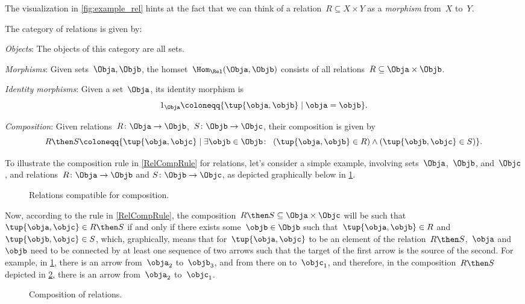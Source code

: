 The visualization in \cref{fig:example_rel} hints at the fact that we can think of a relation~$R \subseteq X \times Y$ as a \emph{morphism} from~$X$ to~$Y$.

\begin{ctdefinition}
  The category \iindex{\Rel} of relations \Rel is given by:
  \begin{compactenum}
    \item \emph{Objects}: The objects of this category are all sets.
    \item \emph{Morphisms}: Given sets~$\Obja, \Objb$, the homset~$\Hom_{\Rel}(\Obja,\Objb)$ consists of all
    relations~$R\subseteq \Obja\times \Objb$.
    \item \emph{Identity morphisms}: Given a set~$\Obja$, its identity morphism is
    \begin{equation}
      1_\Obja \coloneqq \{ \tup{\obja,\objb} \mid  \obja = \objb \}.
    \end{equation}
    \item \emph{Composition}: Given relations~$R \colon \Obja\to \Objb$,~$S\colon \Objb\to \Objc$, their composition is given by
    \begin{equation}
      \label{RelCompRule}
      R \then S \coloneqq \{\tup{\obja,\objc} \mid  \exists \objb \in \Objb \colon \ \left(\tup{\obja,\objb} \in R\right) \wedge \left(\tup{\objb,\objc} \in S\right)\}.
    \end{equation}
  \end{compactenum}
\end{ctdefinition}

To illustrate the composition rule in \cref{RelCompRule} for relations, let's consider a simple example, involving sets~$\Obja$,~$\Objb$, and~$\Objc$, and relations~$R \colon \Obja \to \Objb$ and $S \colon \Objb \to \Objc$, as depicted graphically below in \cref{fig:example_rel_composable}.
\begin{figure}[h!]
  \centering
  \caption{Relations compatible for composition.}
  \label{fig:example_rel_composable}
\end{figure}
Now, according to the rule in \cref{RelCompRule}, the composition~$R \then S \subseteq \Obja \times \Objc$ will be such that~$\tup{\obja,\objc} \in R \then S$ if and only if there exists some~$\objb \in \Objb$ such that~$\tup{\obja,\objb} \in R$ and~$\tup{\objb,\objc} \in S$, which, graphically, means that for~$\tup{\obja,\objc}$ to be an element of the relation~$R \then S$,~$\obja$ and~$\objb$ need to be connected by at least one sequence of two arrows such that the target of the first arrow is the source of the second. For example, in \cref{fig:example_rel_composable}, there is an arrow from~$\obja_2$ to~$\objb_3$, and from there on to~$\objc_1$, and therefore, in the composition~$R \then S$ depicted in \cref{fig:example_rel_composed}, there is an arrow from~$\obja_2$ to~$\objc_1$.
\begin{figure}[h!]
  \centering
  \caption{Composition of relations.}
  \label{fig:example_rel_composed}
\end{figure}

